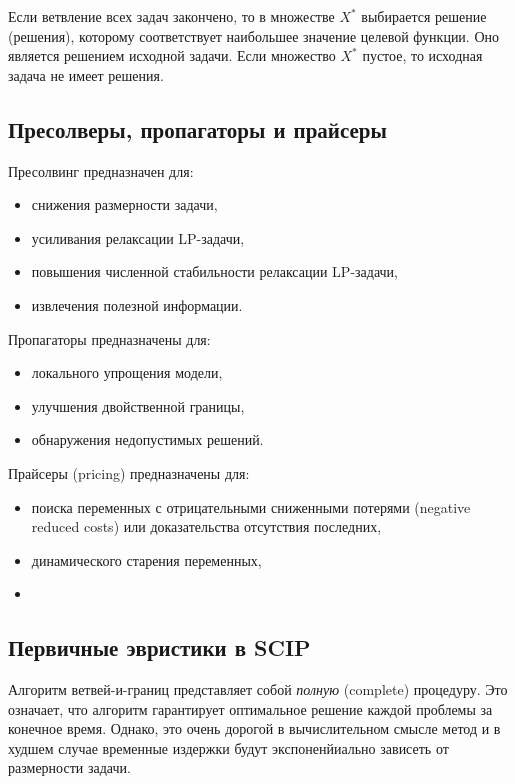\documentclass[%
	11pt,
	a4paper,
	utf8,
		]{article}
\begin{document}
Если ветвление всех задач закончено, то в множестве $ X^* $ выбирается решение (решения), которому соответствует наибольшее значение целевой функции. Оно является решением исходной задачи. Если множество $ X^* $ пустое, то исходная задача не имеет решения.

\subsection{Пресолверы, пропагаторы и прайсеры}

Пресолвинг предназначен для:
\begin{itemize}
	\item снижения размерности задачи,
	
	\item усиливания релаксации LP-задачи,
	
	\item повышения численной стабильности релаксации LP-задачи,
	
	\item извлечения полезной информации.
\end{itemize}

Пропагаторы предназначены для:
\begin{itemize}
	\item локального упрощения модели,
	
	\item улучшения двойственной границы,
	
	\item обнаружения недопустимых решений.
\end{itemize}

Прайсеры (pricing) предназначены для:
\begin{itemize}
	\item поиска переменных с отрицательными сниженными потерями (negative reduced costs) или доказательства отсутствия последних,
	
	\item динамического старения переменных,
	
	\item 
\end{itemize}



\subsection{Первичные эвристики в SCIP}

Алгоритм ветвей-и-границ представляет собой \emph{полную} (complete) процедуру. Это означает, что алгоритм гарантирует оптимальное решение каждой проблемы за конечное время. Однако, это очень дорогой в вычислительном смысле метод и в худшем случае временные издержки будут экспоненйиально зависеть от размерности задачи.
\end{document}
